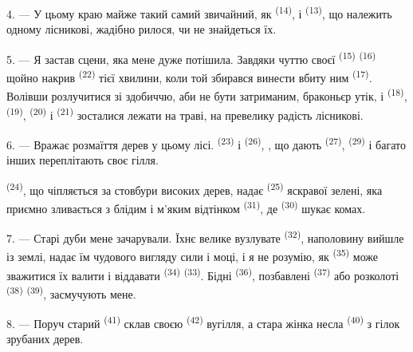 4. --- У цьому краю  майже такий самий звичайний, як
 \textsuperscript{(14)}, і  \textsuperscript{(13)}, що
належить одному лісникові, жадібно рилося, чи не знайдеться їх.

\VUsaut{3.0mm}
\VUsaut{3.0mm}

5. --- Я застав  сцени, яка мене дуже потішила. Завдяки чуттю
своєї  \textsuperscript{(15)}  \textsuperscript{(16)}
щойно накрив  \textsuperscript{(22)} тієї хвилини, коли той
збирався винести вбиту ним  \textsuperscript{(17)}. Волівши
розлучитися зі здобиччю, аби не бути затриманим, браконьєр утік, і
 \textsuperscript{(18)},  \textsuperscript{(19)},
 \textsuperscript{(20)} і  \textsuperscript{(21)}
зосталися лежати на траві, на превелику радість лісникові.

6. --- Вражає розмаїття дерев у цьому лісі.  \textsuperscript{(23)}
і  \textsuperscript{(26)}, , що дають 
\textsuperscript{(27)},  \textsuperscript{(29)} і багато інших
переплітають своє гілля.

 \textsuperscript{(24)}, що чіпляється за стовбури високих дерев,
надає  \textsuperscript{(25)} яскравої зелені,
яка приємно зливається з блідим і м'яким відтінком 
\textsuperscript{(31)}, де  \textsuperscript{(30)} шукає
комах.

\VUsaut{3.0mm}
\VUsaut{3.0mm}

7. --- Старі дуби мене зачарували. Їхнє велике вузлувате 
\textsuperscript{(32)}, наполовину вийшле із землі, надає їм чудового вигляду
сили і моці, і я не розумію, як  \textsuperscript{(35)} може
зважитися їх валити і віддавати  \textsuperscript{(34)}
 \textsuperscript{(33)}. Бідні 
\textsuperscript{(36)}, позбавлені  \textsuperscript{(37)} або
розколоті  \textsuperscript{(38)} 
\textsuperscript{(39)}, засмучують мене.

8. --- Поруч старий  \textsuperscript{(41)} склав своєю
  \textsuperscript{(42)} вугілля, а стара жінка
несла  \textsuperscript{(40)}  з гілок зрубаних
дерев.

